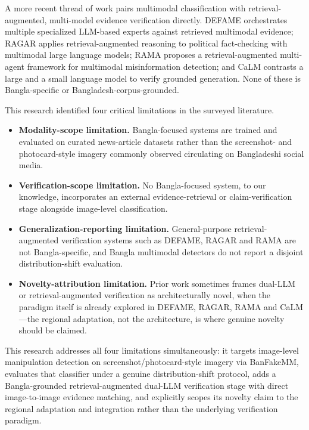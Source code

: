 \documentclass[conference,a4paper]{IEEEtran}
\begin{document}
A more recent thread of work pairs multimodal classification with
retrieval-augmented, multi-model evidence verification directly. DEFAME
\cite{defame} orchestrates multiple specialized LLM-based experts against
retrieved multimodal evidence; RAGAR \cite{ragar} applies retrieval-augmented
reasoning to political fact-checking with multimodal large language models;
RAMA \cite{rama} proposes a retrieval-augmented multi-agent framework for
multimodal misinformation detection; and CaLM \cite{calm} contrasts a large
and a small language model to verify grounded generation. None of these is
Bangla-specific or Bangladesh-corpus-grounded.

This research identified four critical limitations in the surveyed literature.

\begin{itemize}
\item \textbf{Modality-scope limitation.} Bangla-focused systems are trained
and evaluated on curated news-article datasets rather than the screenshot- and
photocard-style imagery commonly observed circulating on Bangladeshi social
media.

\item \textbf{Verification-scope limitation.} No Bangla-focused system, to our
knowledge, incorporates an external evidence-retrieval or claim-verification
stage alongside image-level classification.

\item \textbf{Generalization-reporting limitation.} General-purpose
retrieval-augmented verification systems such as DEFAME, RAGAR and RAMA are
not Bangla-specific, and Bangla multimodal detectors do not report a disjoint
distribution-shift evaluation.

\item \textbf{Novelty-attribution limitation.} Prior work sometimes frames
dual-LLM or retrieval-augmented verification as architecturally novel, when
the paradigm itself is already explored in DEFAME, RAGAR, RAMA and CaLM---the
regional adaptation, not the architecture, is where genuine novelty should be
claimed.
\end{itemize}

This research addresses all four limitations simultaneously: it targets
image-level manipulation detection on screenshot/photocard-style imagery via
BanFakeMM, evaluates that classifier under a genuine distribution-shift
protocol, adds a Bangla-grounded retrieval-augmented dual-LLM verification
stage with direct image-to-image evidence matching, and explicitly scopes its
novelty claim to the regional adaptation and integration rather than the
underlying verification paradigm.
\end{document}
